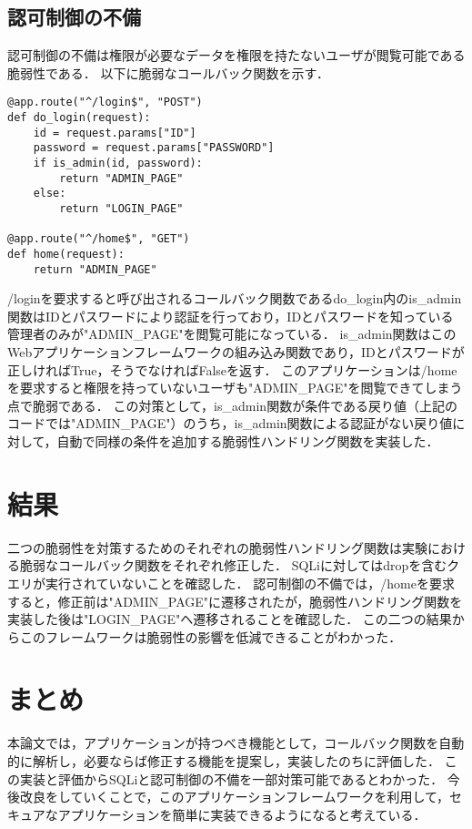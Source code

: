 \documentclass[twocolumn, 10pt, a4paper]{jsarticle}
\begin{document}
\subsection{認可制御の不備}
認可制御の不備は権限が必要なデータを権限を持たないユーザが閲覧可能である脆弱性である．
以下に脆弱なコールバック関数を示す．
\begin{lstlisting}
@app.route("^/login$", "POST")
def do_login(request):
    id = request.params["ID"]
    password = request.params["PASSWORD"]
    if is_admin(id, password):
        return "ADMIN_PAGE"
    else:
        return "LOGIN_PAGE"

@app.route("^/home$", "GET")
def home(request):
    return "ADMIN_PAGE"
\end{lstlisting}
/loginを要求すると呼び出されるコールバック関数であるdo\_login内のis\_admin関数はIDとパスワードにより認証を行っており，IDとパスワードを知っている管理者のみが"ADMIN\_PAGE"を閲覧可能になっている．
is\_admin関数はこのWebアプリケーションフレームワークの組み込み関数であり，IDとパスワードが正しければTrue，そうでなければFalseを返す．
このアプリケーションは/homeを要求すると権限を持っていないユーザも"ADMIN\_PAGE"を閲覧できてしまう点で脆弱である．
この対策として，is\_admin関数が条件である戻り値（上記のコードでは"ADMIN\_PAGE"）のうち，is\_admin関数による認証がない戻り値に対して，自動で同様の条件を追加する脆弱性ハンドリング関数を実装した．

\section{結果}
二つの脆弱性を対策するためのそれぞれの脆弱性ハンドリング関数は実験における脆弱なコールバック関数をそれぞれ修正した．
SQLiに対してはdropを含むクエリが実行されていないことを確認した．
認可制御の不備では，/homeを要求すると，修正前は"ADMIN\_PAGE"に遷移されたが，脆弱性ハンドリング関数を実装した後は"LOGIN\_PAGE"ヘ遷移されることを確認した．
この二つの結果からこのフレームワークは脆弱性の影響を低減できることがわかった．

\section{まとめ}
本論文では，アプリケーションが持つべき機能として，コールバック関数を自動的に解析し，必要ならば修正する機能を提案し，実装したのちに評価した．
この実装と評価からSQLiと認可制御の不備を一部対策可能であるとわかった．
今後改良をしていくことで，このアプリケーションフレームワークを利用して，セキュアなアプリケーションを簡単に実装できるようになると考えている．
\end{document}
